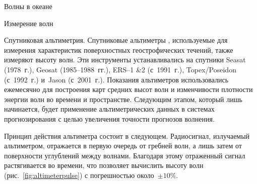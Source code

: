 \begin{chapter}{Волны в океане}
\begin{section}{Измерение волн}
\begin{paragraph}{Спутниковая альтиметрия.} 
Спутниковые альтиметры%
, используемые для измерения характеристик
поверхностных геострофических течений, также измеряют высоту волн.
Эти инструменты устанавливались на спутники Seasat (1978~г.), 
Geosat (1985--1988~гг.),
ERS--1 \&2 (с~1991~г.), 
Topex/Poseidon (с~1992~г.) 
и~Jason (с~2001~г.). 
Показания альтиметров использовались ежемесячно для построения карт
средних высот волн и изменчивости плотности энергии волн во времени 
и пространстве. Следующим этапом, который лишь начинается, будет применение
альтиметрических данных в системах прогнозирования с целью увеличения
точности прогнозов волнения.
%

Принцип действия альтиметра состоит в следующем. Радиосигнал, излучаемый
альтиметром, отражается в первую очередь от гребней волн, а лишь затем
от поверхности углублений между волнами. Благодаря этому отраженный сигнал
растягивается во времени, что позволяет вычислить высоту волн 
(рис.~\ref{fig:altimeterpulse}) с погрешностью около~$\pm 10\%$.
%
\end{paragraph}


\end{section}
\end{chapter}
